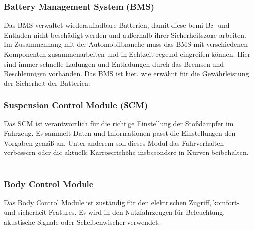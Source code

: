         \subsubsection{Battery Management System (BMS)}
        Das BMS verwaltet wiederaufladbare Batterien, damit diese bemi Be- und Entladen nicht beschädigt werden und außerhalb ihrer
        Sicherheitszone arbeiten. Im Zusammenhang mit der Automobilbranche muss das BMS mit verschiedenen Komponenten
        zusammenarbeiten und in Echtzeit regelnd eingreifen können. Hier sind immer schnelle
        Ladungen und Entladungen durch das Bremsen und Beschleunigen vorhanden. Das BMS ist hier, wie erwähnt für die
        Gewährleistung der Sicherheit der Batterien.
        ~\cite{BMS.PB1} ~\cite{BMS.PB2}

        \subsubsection{Suspension Control Module (SCM)}
        Das SCM ist verantwortlich für die richtige Einstellung der Stoßdämpfer im Fahrzeug. Es sammelt Daten und Informationen
        passt die Einstellungen den Vorgaben gemäß an. Unter anderem soll dieses Modul das Fahrverhalten verbessern oder
        die aktuelle Karroseriehöhe insbesondere in Kurven beibehalten.
        ~\cite{suspensioncontrol.PB1}

        \subsubsection{Body Control Module}
        Das Body Control Module ist zuständig für den elektrischen Zugriff, komfort- und sicherheit Features. Es wird in
        den Nutzfahrzeugen für Beleuchtung, akustische Signale oder Scheibenwischer verwendet.
        ~\cite{BCM.PB1}